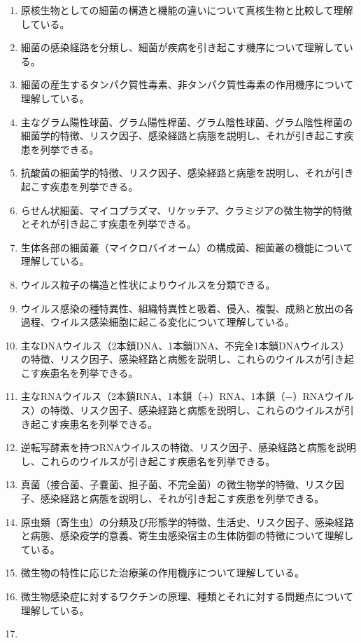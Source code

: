 \begin{enumerate}
\def\labelenumi{\arabic{enumi}.}
\tightlist
\item
  原核生物としての細菌の構造と機能の違いについて真核生物と比較して理解している。
\item
  細菌の感染経路を分類し、細菌が疾病を引き起こす機序について理解している。
\item
  細菌の産生するタンパク質性毒素、非タンパク質性毒素の作用機序について理解している。
\item
  主なグラム陽性球菌、グラム陽性桿菌、グラム陰性球菌、グラム陰性桿菌の細菌学的特徴、リスク因子、感染経路と病態を説明し、それが引き起こす疾患を列挙できる。
\item
  抗酸菌の細菌学的特徴、リスク因子、感染経路と病態を説明し、それが引き起こす疾患を列挙できる。
\item
  らせん状細菌、マイコプラズマ、リケッチア、クラミジアの微生物学的特徴とそれが引き起こす疾患を列挙できる。
\item
  生体各部の細菌叢（マイクロバイオーム）の構成菌、細菌叢の機能について理解している。
\item
  ウイルス粒子の構造と性状によりウイルスを分類できる。
\item
  ウイルス感染の種特異性、組織特異性と吸着、侵入、複製、成熟と放出の各過程、ウイルス感染細胞に起こる変化について理解している。
\item
  主なDNAウイルス（2本鎖DNA、1本鎖DNA、不完全1本鎖DNAウイルス）の特徴、リスク因子、感染経路と病態を説明し、これらのウイルスが引き起こす疾患名を列挙できる。
\item
  主なRNAウイルス（2本鎖RNA、1本鎖（+）RNA、1本鎖（−）RNAウイルス）の特徴、リスク因子、感染経路と病態を説明し、これらのウイルスが引き起こす疾患名を列挙できる。
\item
  逆転写酵素を持つRNAウイルスの特徴、リスク因子、感染経路と病態を説明し、これらのウイルスが引き起こす疾患名を列挙できる。
\item
  真菌（接合菌、子嚢菌、担子菌、不完全菌）の微生物学的特徴、リスク因子、感染経路と病態を説明し、それが引き起こす疾患を列挙できる。
\item
  原虫類（寄生虫）の分類及び形態学的特徴、生活史、リスク因子、感染経路と病態、感染疫学的意義、寄生虫感染宿主の生体防御の特徴について理解している。
\item
  微生物の特性に応じた治療薬の作用機序について理解している。
\item
  微生物感染症に対するワクチンの原理、種類とそれに対する問題点について理解している。
\item

\end{enumerate}
